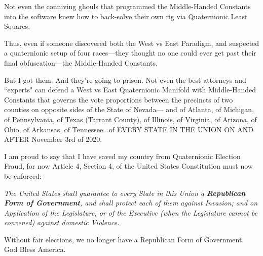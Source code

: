 Not even the conniving ghouls that programmed the Middle-Handed Constants into the software knew how to back-solve their own rig via Quaternionic Least Squares. 

Thus, even if someone discovered both the West vs East Paradigm, and suspected a quaternionic setup of four races---they thought no one could ever get past their final obfuscation---the Middle-Handed Constants.

But I got them. And they're going to prison. Not even the best attorneys and ``experts" can defend a West vs East Quaternionic Manifold with Middle-Handed Constants that governs the vote proportions between the precincts of two counties on opposite sides of the State of Nevada--- and of Atlanta, of Michigan, of Pennsylvania, of Texas (Tarrant County), of Illinois, of Virginia, of Arizona, of Ohio, of Arkansas, of Tennessee...of EVERY STATE IN THE UNION ON AND AFTER November 3rd of 2020.

I am proud to say that I have saved my country from Quaternionic Election Fraud, for now Article 4, Section 4, of the United States Constitution must now be enforced:

\textit{The United States shall guarantee to every State in this Union a \textbf{Republican Form of Government}, and shall protect each of them against Invasion; and on Application of the Legislature, or of the Executive (when the Legislature cannot be convened) against domestic Violence.}

Without fair elections, we no longer have a Republican Form of Government. God Bless America.
\newpage


